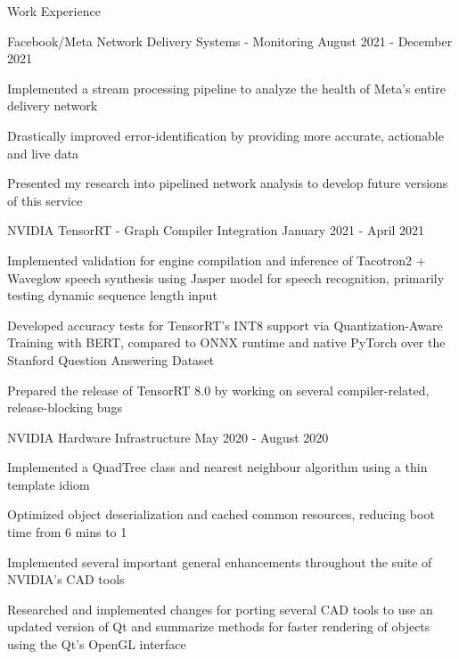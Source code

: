 \documentclass{resume} %
\begin{document}
\begin{rSection}{Work Experience}
    \begin{workexperience}
        {Facebook/Meta}
        {Network Delivery Systems - Monitoring}
        {August 2021 - December 2021}
        {
            \item Implemented a stream processing pipeline to analyze the health of Meta's entire delivery network
            \item Drastically improved error-identification by providing more accurate, actionable and live data
            \item Presented my research into pipelined network analysis to develop future versions of this service
        }
    \end{workexperience}

    \begin{workexperience}
        {NVIDIA}
        {TensorRT - Graph Compiler Integration}
        {January 2021 - April 2021}
        {
            \item Implemented validation for engine compilation and inference of Tacotron2 + Waveglow speech synthesis using Jasper model for speech recognition, primarily testing dynamic sequence length input
            \item Developed accuracy tests for TensorRT's INT8 support via Quantization-Aware Training with BERT, compared to ONNX runtime and native PyTorch over the Stanford Question Answering Dataset
            \item Prepared the release of TensorRT 8.0 by working on several compiler-related, release-blocking bugs
        }
    \end{workexperience}
    \begin{workexperience}
        {NVIDIA}
        {Hardware Infrastructure}
        {May 2020 - August 2020}
        {
            \item Implemented a QuadTree class and nearest neighbour algorithm using a thin template idiom
            \item Optimized object deserialization and cached common resources, reducing boot time from 6 mins to 1
            \item Implemented several important general enhancements throughout the suite of NVIDIA's CAD tools
            \item Researched and implemented changes for porting several CAD tools to use an updated version of Qt and summarize methods for faster rendering of objects using the Qt's OpenGL interface
        }
    \end{workexperience}
    

\end{rSection}
\end{document}
